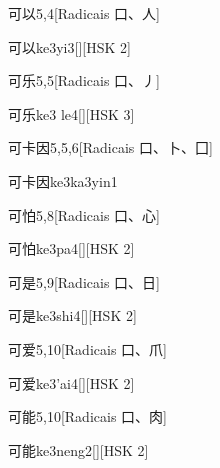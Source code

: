 \begin{entry}{可以}{5,4}[Radicais ⼝、⼈]
  \begin{phonetics}{可以}{ke3yi3}[][HSK 2]
  \end{phonetics}
\end{entry}

\begin{entry}{可乐}{5,5}[Radicais ⼝、⼃]
  \begin{phonetics}{可乐}{ke3 le4}[][HSK 3]
  \end{phonetics}
\end{entry}

\begin{entry}{可卡因}{5,5,6}[Radicais ⼝、⼘、⼞]
  \begin{phonetics}{可卡因}{ke3ka3yin1}
  \end{phonetics}
\end{entry}

\begin{entry}{可怕}{5,8}[Radicais ⼝、⼼]
  \begin{phonetics}{可怕}{ke3pa4}[][HSK 2]
  \end{phonetics}
\end{entry}

\begin{entry}{可是}{5,9}[Radicais ⼝、⽇]
  \begin{phonetics}{可是}{ke3shi4}[][HSK 2]
  \end{phonetics}
\end{entry}

\begin{entry}{可爱}{5,10}[Radicais ⼝、⽖]
  \begin{phonetics}{可爱}{ke3'ai4}[][HSK 2]
  \end{phonetics}
\end{entry}

\begin{entry}{可能}{5,10}[Radicais ⼝、⾁]
  \begin{phonetics}{可能}{ke3neng2}[][HSK 2]
  \end{phonetics}
\end{entry}


